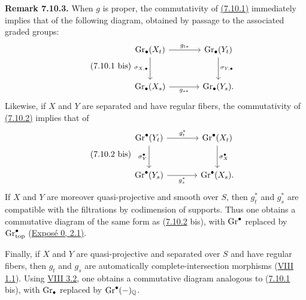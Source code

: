 \textbf{Remark 7.10.3.}
When $g$ is proper, the commutativity of \hyperlink{sga6.e10.eq.7-10-1}{(7.10.1)} immediately implies that
of the following diagram, obtained by passage to the associated graded
groups:
\begin{equation}\tag{7.10.1 bis}
\begin{tikzcd}[column sep=large,row sep=large]
\Gr_\bullet(X_t) \arrow[r,"g_{t*}"]
  \arrow[d,"\sigma_{X,\bullet}"'] &
\Gr_\bullet(Y_t) \arrow[d,"\sigma_{Y,\bullet}"]\\
\Gr_\bullet(X_s) \arrow[r,"g_{s*}"'] & \Gr_\bullet(Y_s).
\end{tikzcd}
\end{equation}
Likewise, if $X$ and $Y$ are separated and have regular fibers, the
commutativity of \hyperlink{sga6.e10.eq.7-10-2}{(7.10.2)} implies that of
\begin{equation}\tag{7.10.2 bis}
\begin{tikzcd}[column sep=large,row sep=large]
\Gr^\bullet(Y_t) \arrow[r,"g_t^*"] \arrow[d,"\sigma_Y^\bullet"'] &
\Gr^\bullet(X_t) \arrow[d,"\sigma_X^\bullet"]\\
\Gr^\bullet(Y_s) \arrow[r,"g_s^*"'] & \Gr^\bullet(X_s).
\end{tikzcd}
\end{equation}
If $X$ and $Y$ are moreover quasi-projective and smooth over $S$, then
$g_t^*$ and $g_s^*$ are compatible with the filtrations by codimension of
supports. Thus one obtains a commutative diagram of the same form as
(\hyperlink{sga6.e10.eq.7-10-2}{7.10.2} bis), with $\operatorname{Gr}^\bullet$ replaced by
$\operatorname{Gr}_{\mathrm{top}}^\bullet$ (\hyperlink{sga6.e00.sec.2.1}{Expos\'e 0, 2.1)}.

Finally, if $X$ and $Y$ are quasi-projective and separated over $S$ and have
regular fibers, then $g_t$ and $g_s$ are automatically complete-intersection
morphisms (\hyperlink{sga6.e08.def.1-1}{VIII 1.1}). Using \hyperlink{sga6.e08.prop.3-2}{VIII 3.2}, one obtains a commutative diagram
analogous to (\hyperlink{sga6.e10.eq.7-10-1}{7.10.1} bis), with $\operatorname{Gr}_\bullet$ replaced by
$\operatorname{Gr}^\bullet(-)_{\mathbb Q}$.

